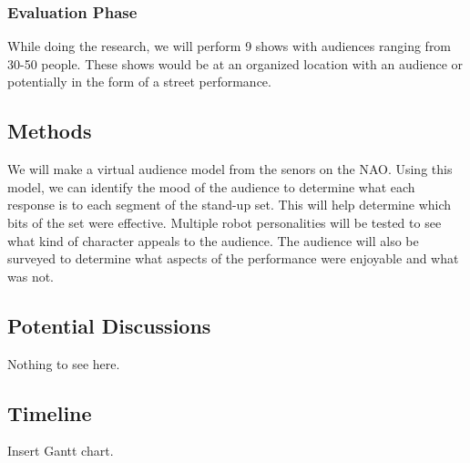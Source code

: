 \documentclass[onecolumn, draftclsnofoot,10pt, compsoc]{IEEEtran}
\begin{document}
\subsubsection{Evaluation Phase}
While doing the research, we will perform 9 shows with audiences ranging from 30-50 people. These shows would be at an organized location with an audience or potentially in the form of a street performance.

\subsection{Methods}
We will make a virtual audience model from the senors on the NAO. Using this model, we can identify the mood of the audience to determine what each response is to each segment of the stand-up set. This will help determine which bits of the set were effective. Multiple robot personalities will be tested to see what kind of character appeals to the audience. The audience will also be surveyed to determine what aspects of the performance were enjoyable and what was not.


\subsection{Potential Discussions}

Nothing to see here.

\subsection{Timeline}

Insert Gantt chart.




\end{document}
